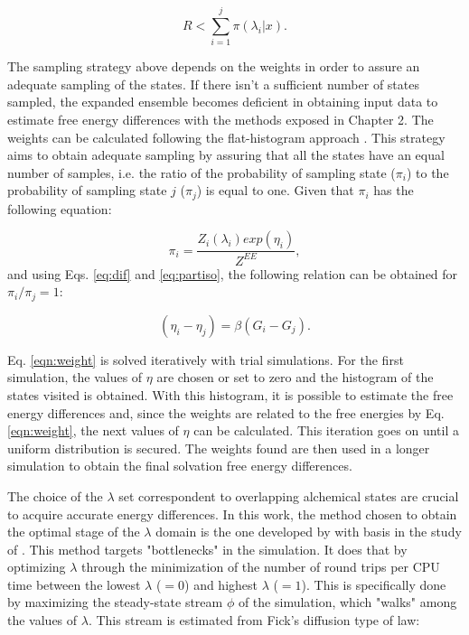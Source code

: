 	\begin{equation}
	R < \sum_{i=1}^{j} \pi(\lambda_{i}|x) .
	\label{eqn:relee2}
	\end{equation} 
	
	The sampling strategy above depends on the weights in order to assure an adequate sampling of the states. If there isn't a sufficient number of states sampled, the expanded ensemble becomes deficient in obtaining input data to estimate free energy differences with the methods exposed in Chapter 2. The weights can be calculated following the flat-histogram approach \cite{bernd1992,bernd1993,dayal2004}. This strategy aims to obtain adequate sampling by assuring that all the states have an equal number of samples, i.e. the ratio of the probability of sampling state ($\pi_{i}$) to the probability of sampling state $j$ ($\pi_{j}$) is equal to one. Given that $\pi_{i}$ has the following equation:
	
	\begin{equation}
	\pi_{i} = \dfrac{Z_{i}(\lambda_{i}) exp(\eta_{i})}{Z^{EE}} ,
	\label{eqn:wei1}
	\end{equation} 
	and using Eqs. \ref{eq:dif} and \ref {eq:partiso}, the following relation can be obtained for $\pi_{i}/\pi_{j}=1$:
	
	\begin{equation}
	(\eta_{i} - \eta_{j}) = \beta(G_i-G_j).
	\label{eqn:weight}
	\end{equation}
	
	Eq. \eqref{eqn:weight} is solved iteratively with trial simulations. For the first simulation, the values of $\eta$ are chosen or set to zero and the histogram of the states visited is obtained. With this histogram, it is possible to estimate the free energy differences and, since the weights are related to the free energies by Eq. \eqref{eqn:weight}, the next values of $\eta$ can be calculated. This iteration goes on until a uniform distribution is secured. The weights found are then used in a longer simulation to obtain the final solvation free energy differences.
	
	The choice of the $\lambda$ set correspondent to overlapping alchemical states are crucial to acquire accurate energy differences. In this work, the method chosen to obtain the optimal stage of the $\lambda$ domain is the one developed by  with basis in the study of  . This method targets "bottlenecks" in the simulation. It does that by optimizing $\lambda$ through the minimization of the number of round trips per CPU time between the lowest $\lambda$ ($=0$) and highest $\lambda$ ($=1$). This is specifically done by maximizing the steady-state stream $\phi$ of the simulation, which "walks" among the values of $\lambda$. This stream is estimated from Fick's diffusion type of law:
	
